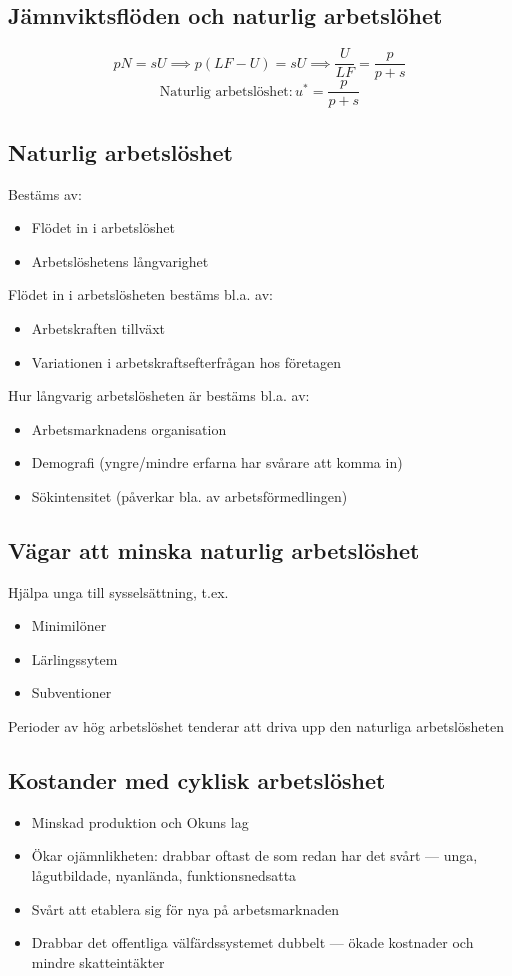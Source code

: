 \documentclass[12pt,a4paper]{article}
\begin{document}
\subsection{Jämnviktsflöden och naturlig arbetslöhet}
$$pN = sU \implies p(LF - U) = sU \implies \frac{U}{LF} = \frac{p}{p+s}$$ 
$$\text{Naturlig arbetslöshet}: u^* = \frac{p}{p+s}$$

\subsection{Naturlig arbetslöshet}
Bestäms av:
\begin{itemize}
    \item Flödet in i arbetslöshet
    \item Arbetslöshetens långvarighet
\end{itemize}

\noindent Flödet in i arbetslösheten bestäms bl.a. av:
\begin{itemize}
    \item Arbetskraften tillväxt
    \item Variationen i arbetskraftsefterfrågan hos företagen 
\end{itemize}

\noindent Hur långvarig arbetslösheten är bestäms bl.a. av:
\begin{itemize}
    \item Arbetsmarknadens organisation
    \item Demografi (yngre/mindre erfarna har svårare att komma in)
    \item Sökintensitet (påverkar bla. av arbetsförmedlingen)
\end{itemize}

\subsection{Vägar att minska naturlig arbetslöshet}
Hjälpa unga till sysselsättning, t.ex.
\begin{itemize}
    \item Minimilöner
    \item Lärlingssytem 
    \item Subventioner
\end{itemize}
\noindent Perioder av hög arbetslöshet tenderar att driva upp den naturliga arbetslösheten 

\subsection{Kostander med cyklisk arbetslöshet}
\begin{itemize}
    \item Minskad produktion och Okuns lag
    \item Ökar ojämnlikheten: drabbar oftast de som redan har det svårt --- unga, lågutbildade, nyanlända, funktionsnedsatta
    \item Svårt att etablera sig för nya på arbetsmarknaden 
    \item Drabbar det offentliga välfärdssystemet dubbelt --- ökade kostnader och mindre skatteintäkter
\end{itemize}
\end{document}
